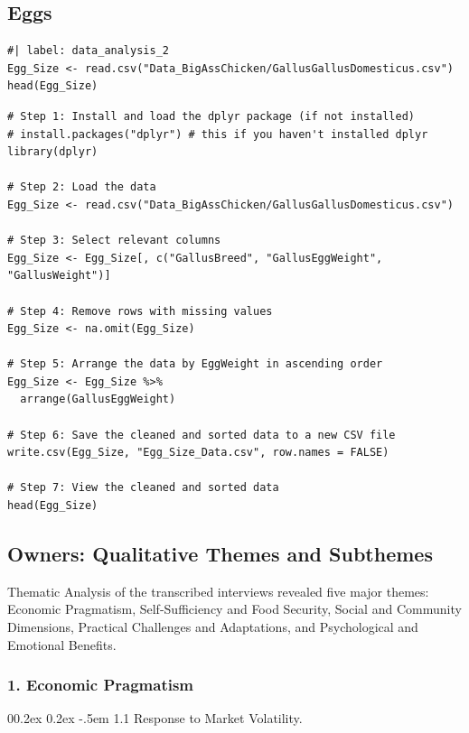 \documentclass[
  man,
  floatsintext,
  longtable,
  nolmodern,
  notxfonts,
  notimes,
  colorlinks=true,linkcolor=blue,citecolor=blue,urlcolor=blue]{apa7}
\makeatletter
\renewcommand{\paragraph}{\@startsection{paragraph}{4}{\parindent}%
	{0\baselineskip \@plus 0.2ex \@minus 0.2ex}%
	{-.5em}%
	{\normalfont\normalsize\bfseries\typesectitle}}
\makeatother
\begin{document}
\subsection{Eggs}\label{eggs}

\begin{verbatim}
#| label: data_analysis_2
Egg_Size <- read.csv("Data_BigAssChicken/GallusGallusDomesticus.csv")
head(Egg_Size)
\end{verbatim}

\begin{verbatim}
# Step 1: Install and load the dplyr package (if not installed)
# install.packages("dplyr") # this if you haven't installed dplyr
library(dplyr)

# Step 2: Load the data
Egg_Size <- read.csv("Data_BigAssChicken/GallusGallusDomesticus.csv")

# Step 3: Select relevant columns
Egg_Size <- Egg_Size[, c("GallusBreed", "GallusEggWeight", "GallusWeight")]

# Step 4: Remove rows with missing values
Egg_Size <- na.omit(Egg_Size)

# Step 5: Arrange the data by EggWeight in ascending order
Egg_Size <- Egg_Size %>%
  arrange(GallusEggWeight)

# Step 6: Save the cleaned and sorted data to a new CSV file
write.csv(Egg_Size, "Egg_Size_Data.csv", row.names = FALSE)

# Step 7: View the cleaned and sorted data
head(Egg_Size)
\end{verbatim}

\subsection{Owners: Qualitative Themes and
Subthemes}\label{owners-qualitative-themes-and-subthemes}

Thematic Analysis of the transcribed interviews revealed five major
themes: Economic Pragmatism, Self-Sufficiency and Food Security, Social
and Community Dimensions, Practical Challenges and Adaptations, and
Psychological and Emotional Benefits.

\subsubsection{1. Economic Pragmatism}\label{economic-pragmatism}

\paragraph{1.1 Response to Market
Volatility.}\label{response-to-market-volatility}
\end{document}
